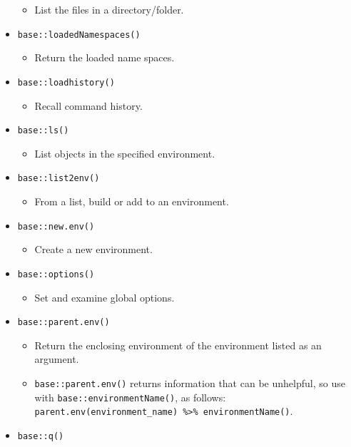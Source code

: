 \documentclass[
]{book}
\providecommand{\tightlist}{%
  \setlength{\itemsep}{0pt}\setlength{\parskip}{0pt}}
\begin{document}
\begin{itemize}
  \begin{itemize}
  \tightlist
  \item
    List the files in a directory/folder.
  \end{itemize}
\item
  \texttt{base::loadedNamespaces()}

  \begin{itemize}
  \tightlist
  \item
    Return the loaded name spaces.
  \end{itemize}
\item
  \texttt{base::loadhistory()}

  \begin{itemize}
  \tightlist
  \item
    Recall command history.
  \end{itemize}
\item
  \texttt{base::ls()}

  \begin{itemize}
  \tightlist
  \item
    List objects in the specified environment.
  \end{itemize}
\item
  \texttt{base::list2env()}

  \begin{itemize}
  \tightlist
  \item
    From a list, build or add to an environment.
  \end{itemize}
\item
  \texttt{base::new.env()}

  \begin{itemize}
  \tightlist
  \item
    Create a new environment.
  \end{itemize}
\item
  \texttt{base::options()}

  \begin{itemize}
  \tightlist
  \item
    Set and examine global options.
  \end{itemize}
\item
  \texttt{base::parent.env()}

  \begin{itemize}
  \tightlist
  \item
    Return the enclosing environment of the environment listed as an argument.
  \item
    \texttt{base::parent.env()} returns information that can be unhelpful, so use with \texttt{base::environmentName()}, as follows: \texttt{parent.env(environment\_name)\ \%\textgreater{}\%\ environmentName()}.
  \end{itemize}
\item
  \texttt{base::q()}


\end{itemize}
\end{document}
